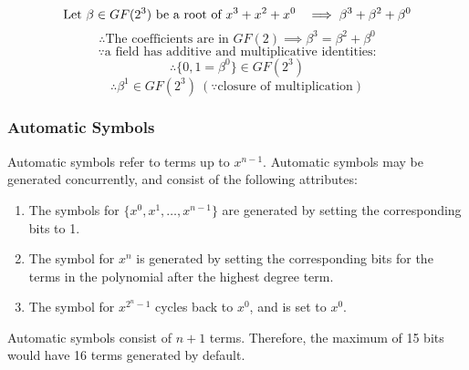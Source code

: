         \[ \text{Let }\beta \in GF(2^{3}) \text{ be a root of
                $x^{3}+x^{2}+x^{0}$~ }\implies \beta^{3}+\beta^{2}+\beta^{0} \]
        \[ \therefore \text{The coefficients are in }GF(2) \implies
        \beta^{3}=\beta^{2}+\beta^{0} \]
        \[ \because \text{a field has additive and multiplicative identities:}
        \]
        \[ \therefore \{ 0, 1=\beta^{0} \} \in GF(2^{3}) \]
        \[ \therefore \beta^{1} \in GF(2^{3}) \ (\because \text{closure of  multiplication}) \]

    \subsubsection{Automatic Symbols}

    Automatic symbols refer to terms up to $x^{n-1}$. Automatic symbols may be
    generated concurrently, and consist of the following attributes:
    \begin{enumerate}
        \item The symbols for $\{x^{0}, x^{1}, \ldots, x^{n-1}\}$ are generated
        by setting the corresponding bits to 1.
        \item The symbol for $x^{n}$ is generated by setting the corresponding
        bits for the terms in the polynomial after the highest degree term.
        \item The symbol for $x^{2^{n}-1}$ cycles back to $x^{0}$, and is set
        to $x^{0}$.
    \end{enumerate}

        Automatic symbols consist of $n+1$ terms. Therefore, the maximum of 15
        bits would have 16 terms generated by default.


